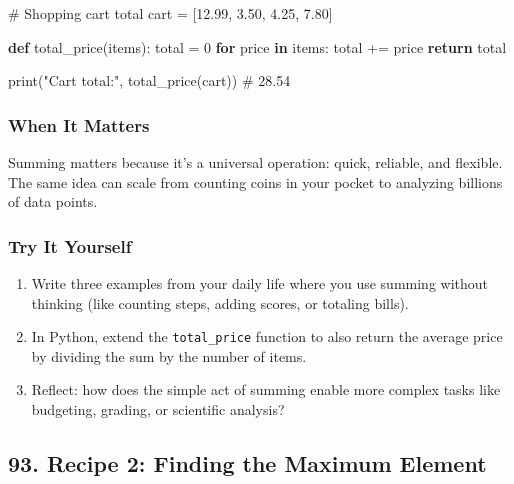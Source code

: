 \documentclass[
  letterpaper,
  DIV=11,
  numbers=noendperiod]{scrreprt}
\newenvironment{Shaded}{\begin{snugshade}}{\end{snugshade}}
\newcommand{\BuiltInTok}[1]{\textcolor[rgb]{0.00,0.23,0.31}{#1}}
\newcommand{\CommentTok}[1]{\textcolor[rgb]{0.37,0.37,0.37}{#1}}
\newcommand{\ControlFlowTok}[1]{\textcolor[rgb]{0.00,0.23,0.31}{\textbf{#1}}}
\newcommand{\DecValTok}[1]{\textcolor[rgb]{0.68,0.00,0.00}{#1}}
\newcommand{\FloatTok}[1]{\textcolor[rgb]{0.68,0.00,0.00}{#1}}
\newcommand{\KeywordTok}[1]{\textcolor[rgb]{0.00,0.23,0.31}{\textbf{#1}}}
\newcommand{\NormalTok}[1]{\textcolor[rgb]{0.00,0.23,0.31}{#1}}
\newcommand{\OperatorTok}[1]{\textcolor[rgb]{0.37,0.37,0.37}{#1}}
\newcommand{\StringTok}[1]{\textcolor[rgb]{0.13,0.47,0.30}{#1}}
\providecommand{\tightlist}{%
  \setlength{\itemsep}{0pt}\setlength{\parskip}{0pt}}
\begin{document}
\begin{Shaded}
\begin{Highlighting}[]
\CommentTok{\# Shopping cart total}
\NormalTok{cart }\OperatorTok{=}\NormalTok{ [}\FloatTok{12.99}\NormalTok{, }\FloatTok{3.50}\NormalTok{, }\FloatTok{4.25}\NormalTok{, }\FloatTok{7.80}\NormalTok{]}

\KeywordTok{def}\NormalTok{ total\_price(items):}
\NormalTok{    total }\OperatorTok{=} \DecValTok{0}
    \ControlFlowTok{for}\NormalTok{ price }\KeywordTok{in}\NormalTok{ items:}
\NormalTok{        total }\OperatorTok{+=}\NormalTok{ price}
    \ControlFlowTok{return}\NormalTok{ total}

\BuiltInTok{print}\NormalTok{(}\StringTok{"Cart total:"}\NormalTok{, total\_price(cart))  }\CommentTok{\# 28.54}
\end{Highlighting}
\end{Shaded}

\subsubsection{When It Matters}\label{when-it-matters-90}

Summing matters because it's a universal operation: quick, reliable, and
flexible. The same idea can scale from counting coins in your pocket to
analyzing billions of data points.

\subsubsection{Try It Yourself}\label{try-it-yourself-92}

\begin{enumerate}
\def\labelenumi{\arabic{enumi}.}
\tightlist
\item
  Write three examples from your daily life where you use summing
  without thinking (like counting steps, adding scores, or totaling
  bills).
\item
  In Python, extend the \texttt{total\_price} function to also return
  the average price by dividing the sum by the number of items.
\item
  Reflect: how does the simple act of summing enable more complex tasks
  like budgeting, grading, or scientific analysis?
\end{enumerate}

\subsection{93. Recipe 2: Finding the Maximum
Element}\label{recipe-2-finding-the-maximum-element}
\end{document}
